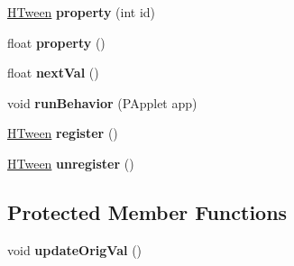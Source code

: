\begin{DoxyCompactItemize}
\item 
\hypertarget{classhype_1_1behavior_1_1_h_tween_a7f0d7cd38ab1ca1650b5ee561a367872}{\hyperlink{classhype_1_1behavior_1_1_h_tween}{H\-Tween} {\bfseries property} (int id)}\label{classhype_1_1behavior_1_1_h_tween_a7f0d7cd38ab1ca1650b5ee561a367872}

\item 
\hypertarget{classhype_1_1behavior_1_1_h_tween_a36531f6a08eecde9bf6316c7ed434b9f}{float {\bfseries property} ()}\label{classhype_1_1behavior_1_1_h_tween_a36531f6a08eecde9bf6316c7ed434b9f}

\item 
\hypertarget{classhype_1_1behavior_1_1_h_tween_aed76e60412c5f07d925afdac4ceca836}{float {\bfseries next\-Val} ()}\label{classhype_1_1behavior_1_1_h_tween_aed76e60412c5f07d925afdac4ceca836}

\item 
\hypertarget{classhype_1_1behavior_1_1_h_tween_ac12d69a33663b6c1ece91571cacfbefa}{void {\bfseries run\-Behavior} (P\-Applet app)}\label{classhype_1_1behavior_1_1_h_tween_ac12d69a33663b6c1ece91571cacfbefa}

\item 
\hypertarget{classhype_1_1behavior_1_1_h_tween_acc1ec1b56ea2daf3188308a1029e31f6}{\hyperlink{classhype_1_1behavior_1_1_h_tween}{H\-Tween} {\bfseries register} ()}\label{classhype_1_1behavior_1_1_h_tween_acc1ec1b56ea2daf3188308a1029e31f6}

\item 
\hypertarget{classhype_1_1behavior_1_1_h_tween_ac1571701e84ef4a06f9d87ec66246ad5}{\hyperlink{classhype_1_1behavior_1_1_h_tween}{H\-Tween} {\bfseries unregister} ()}\label{classhype_1_1behavior_1_1_h_tween_ac1571701e84ef4a06f9d87ec66246ad5}

\end{DoxyCompactItemize}
\subsection*{Protected Member Functions}
\begin{DoxyCompactItemize}
\item 
\hypertarget{classhype_1_1behavior_1_1_h_tween_a5d92b85e690e33e68cadff24cbf81409}{void {\bfseries update\-Orig\-Val} ()}\label{classhype_1_1behavior_1_1_h_tween_a5d92b85e690e33e68cadff24cbf81409}

\end{DoxyCompactItemize}
